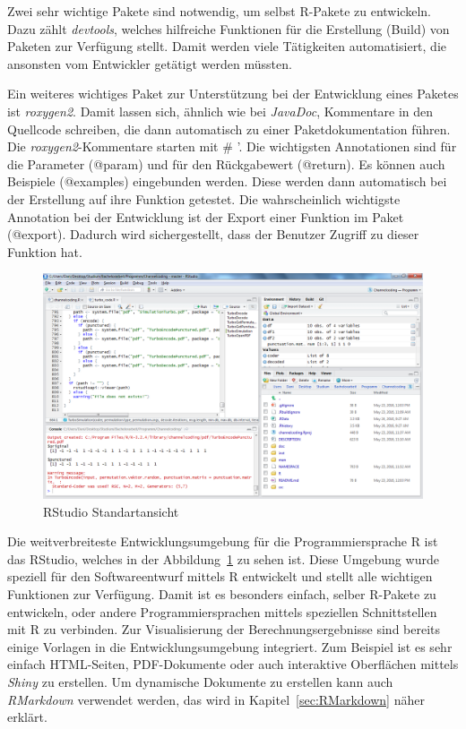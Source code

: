 Zwei sehr wichtige Pakete sind notwendig, um selbst R-Pakete zu entwickeln. Dazu zählt \emph{devtools}, welches hilfreiche Funktionen für die Erstellung (Build) von Paketen zur Verfügung stellt. Damit werden viele Tätigkeiten automatisiert, die ansonsten vom Entwickler getätigt werden müssten.~\cite{devtools}

Ein weiteres wichtiges Paket zur Unterstützung bei der Entwicklung eines Paketes ist \emph{roxygen2}. Damit lassen sich, ähnlich wie bei \emph{JavaDoc}, Kommentare in den Quellcode schreiben, die dann automatisch zu einer Paketdokumentation führen. Die \emph{roxygen2}-Kommentare starten mit \# '. Die wichtigsten Annotationen sind für die Parameter (@param) und für den Rückgabewert (@return). Es können auch Beispiele (@examples) eingebunden werden. Diese werden dann automatisch bei der Erstellung auf ihre Funktion getestet. Die wahrscheinlich wichtigste Annotation bei der Entwicklung ist der Export einer Funktion im Paket (@export). Dadurch wird sichergestellt, dass der Benutzer Zugriff zu dieser Funktion hat.~\cite{roxygen}

\begin{figure}[th]
\centering
\includegraphics[width=\ScaleIfNeeded]{pictures/RStudio}
\caption{RStudio Standartansicht}
\label{pic:RStudio}
\end{figure}

Die weitverbreiteste Entwicklungsumgebung für die Programmiersprache R ist das RStudio, welches in der Abbildung~\ref{pic:RStudio} zu sehen ist. Diese Umgebung wurde speziell für den Softwareentwurf mittels R entwickelt und stellt alle wichtigen Funktionen zur Verfügung. Damit ist es besonders einfach, selber R-Pakete zu entwickeln, oder andere Programmiersprachen mittels speziellen Schnittstellen mit R zu verbinden. Zur Visualisierung der Berechnungsergebnisse sind bereits einige Vorlagen in die Entwicklungsumgebung integriert. Zum Beispiel ist es sehr einfach HTML-Seiten, PDF-Dokumente oder auch interaktive Oberflächen mittels \emph{Shiny} zu erstellen. Um dynamische Dokumente zu erstellen kann auch \emph{RMarkdown} verwendet werden, das wird in Kapitel~\ref{sec:RMarkdown} näher erklärt.

